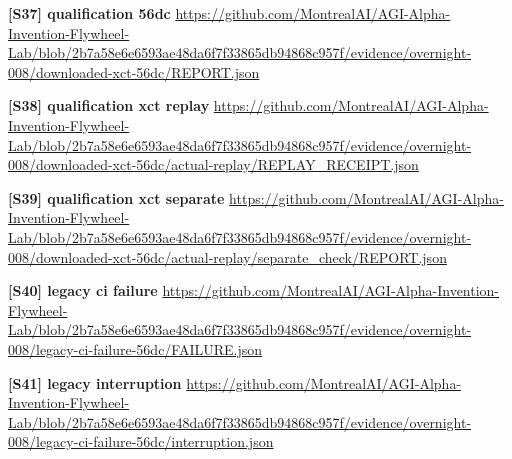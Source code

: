 \documentclass[11pt,letterpaper]{article}
\begin{document}
\begin{samepage}\small\textbf{[S37] qualification 56dc} \url{https://github.com/MontrealAI/AGI-Alpha-Invention-Flywheel-Lab/blob/2b7a58e6e6593ae48da6f7f33865db94868c957f/evidence/overnight-008/downloaded-xct-56dc/REPORT.json}\par\normalsize\end{samepage}
\begin{samepage}\small\textbf{[S38] qualification xct replay} \url{https://github.com/MontrealAI/AGI-Alpha-Invention-Flywheel-Lab/blob/2b7a58e6e6593ae48da6f7f33865db94868c957f/evidence/overnight-008/downloaded-xct-56dc/actual-replay/REPLAY_RECEIPT.json}\par\normalsize\end{samepage}
\begin{samepage}\small\textbf{[S39] qualification xct separate} \url{https://github.com/MontrealAI/AGI-Alpha-Invention-Flywheel-Lab/blob/2b7a58e6e6593ae48da6f7f33865db94868c957f/evidence/overnight-008/downloaded-xct-56dc/actual-replay/separate_check/REPORT.json}\par\normalsize\end{samepage}
\begin{samepage}\small\textbf{[S40] legacy ci failure} \url{https://github.com/MontrealAI/AGI-Alpha-Invention-Flywheel-Lab/blob/2b7a58e6e6593ae48da6f7f33865db94868c957f/evidence/overnight-008/legacy-ci-failure-56dc/FAILURE.json}\par\normalsize\end{samepage}
\begin{samepage}\small\textbf{[S41] legacy interruption} \url{https://github.com/MontrealAI/AGI-Alpha-Invention-Flywheel-Lab/blob/2b7a58e6e6593ae48da6f7f33865db94868c957f/evidence/overnight-008/legacy-ci-failure-56dc/interruption.json}\par\normalsize\end{samepage}
\end{document}
